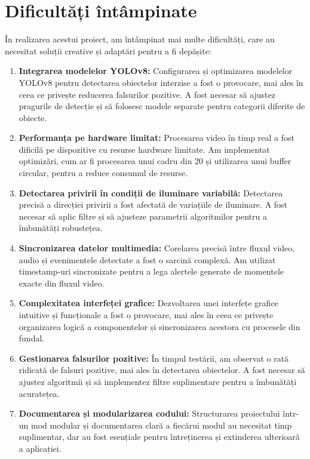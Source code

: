 \documentclass[12pt,a4paper]{article}
\begin{document}
\section{Dificultăți întâmpinate}

În realizarea acestui proiect, am întâmpinat mai multe dificultăți, care au necesitat soluții creative și adaptări pentru a fi depășite:

\begin{enumerate}
    \item \textbf{Integrarea modelelor YOLOv8:} Configurarea și optimizarea modelelor YOLOv8 pentru detectarea obiectelor interzise a fost o provocare, mai ales în ceea ce privește reducerea falsurilor pozitive. A fost necesar să ajustez pragurile de detecție și să folosesc modele separate pentru categorii diferite de obiecte.

    \item \textbf{Performanța pe hardware limitat:} Procesarea video în timp real a fost dificilă pe dispozitive cu resurse hardware limitate. Am implementat optimizări, cum ar fi procesarea unui cadru din 20 și utilizarea unui buffer circular, pentru a reduce consumul de resurse.

    \item \textbf{Detectarea privirii în condiții de iluminare variabilă:} Detectarea precisă a direcției privirii a fost afectată de variațiile de iluminare. A fost necesar să aplic filtre și să ajusteze parametrii algoritmilor pentru a îmbunătăți robustețea.

    \item \textbf{Sincronizarea datelor multimedia:} Corelarea precisă între fluxul video, audio și evenimentele detectate a fost o sarcină complexă. Am utilizat timestamp-uri sincronizate pentru a lega alertele generate de momentele exacte din fluxul video.

    \item \textbf{Complexitatea interfeței grafice:} Dezvoltarea unei interfețe grafice intuitive și funcționale a fost o provocare, mai ales în ceea ce privește organizarea logică a componentelor și sincronizarea acestora cu procesele din fundal.

    \item \textbf{Gestionarea falsurilor pozitive:} În timpul testării, am observat o rată ridicată de falsuri pozitive, mai ales în detectarea obiectelor. A fost necesar să ajustez algoritmii și să implementez filtre suplimentare pentru a îmbunătăți acuratețea.

    \item \textbf{Documentarea și modularizarea codului:} Structurarea proiectului într-un mod modular și documentarea clară a fiecărui modul au necesitat timp suplimentar, dar au fost esențiale pentru întreținerea și extinderea ulterioară a aplicației.


\end{enumerate}
\end{document}

